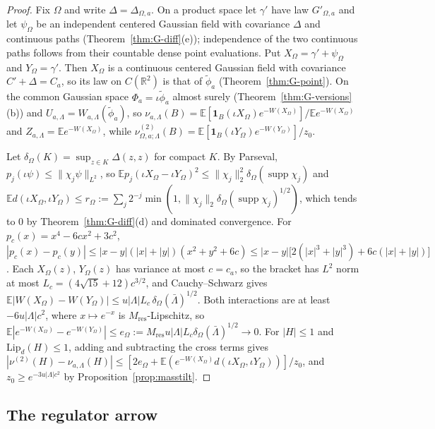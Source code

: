 \documentclass[11pt]{article}
\theoremstyle{plain}
\theoremstyle{definition}
\theoremstyle{remark}
\newcommand{\R}{\mathbb{R}}
\newcommand{\E}{\mathbb{E}}
\newcommand{\ind}{\mathbf{1}}
\DeclareMathOperator{\supp}{supp}
\begin{document}
\begin{proof}
Fix $\Omega$ and write $\Delta=\Delta_{\Omega,a}$. On a product space let $\gamma'$ have law
$G'_{\Omega,a}$ and let $\psi_\Omega$ be an independent centered Gaussian field with
covariance $\Delta$ and continuous paths (Theorem~\ref{thm:G-diff}(e)); independence
of the two continuous paths follows from their countable dense point
evaluations. Put $X_\Omega=\gamma'+\psi_\Omega$ and $Y_\Omega=\gamma'$. Then $X_\Omega$ is a continuous
centered Gaussian field with covariance $C'+\Delta=C_a$, so its law on $C(\R^{2})$ is
that of $\tilde\phi_a$ (Theorem~\ref{thm:G-point}). On the common Gaussian space
$\Phi_a=\iota\tilde\phi_a$ almost surely (Theorem~\ref{thm:G-versions}(b)) and
$U_{a,\Lambda}=W_{a,\Lambda}(\tilde\phi_a)$, so
$\nu_{a,\Lambda}(B)=\E[\ind_B(\iota X_\Omega)e^{-W(X_\Omega)}]/\E e^{-W(X_\Omega)}$ and
$Z_{a,\Lambda}=\E e^{-W(X_\Omega)}$, while
$\nu^{(2)}_{\Omega,a;\Lambda}(B)=\E[\ind_B(\iota Y_\Omega)e^{-W(Y_\Omega)}]/z_0$.

Let $\delta_\Omega(K)=\sup_{z\in K}\Delta(z,z)$ for compact $K$. By Parseval,
$p_j(\iota\psi)\le\|\chi_j\psi\|_{L^{2}}$, so
$\E p_j(\iota X_\Omega-\iota Y_\Omega)^{2}\le\|\chi_j\|_2^{2}\delta_\Omega(\supp\chi_j)$ and
$\E d(\iota X_\Omega,\iota Y_\Omega)\le r_\Omega:=\sum_j2^{-j}\min(1,\|\chi_j\|_2\delta_\Omega(\supp\chi_j)^{1/2})$,
which tends to $0$ by Theorem~\ref{thm:G-diff}(d) and dominated convergence.
For $p_c(x)=x^{4}-6cx^{2}+3c^{2}$,
$|p_c(x)-p_c(y)|\le|x-y|(|x|+|y|)(x^{2}+y^{2}+6c)\le|x-y|\bigl[2(|x|^{3}+|y|^{3})+6c(|x|+|y|)\bigr]$.
Each $X_\Omega(z)$, $Y_\Omega(z)$ has variance at most $c=c_a$, so the bracket has $L^{2}$
norm at most $L_c=(4\sqrt{15}+12)c^{3/2}$, and Cauchy--Schwarz gives
$\E|W(X_\Omega)-W(Y_\Omega)|\le u|\Lambda|L_c\,\delta_\Omega(\bar\Lambda)^{1/2}$. Both interactions are at
least $-6u|\Lambda|c^{2}$, where $x\mapsto e^{-x}$ is $M_{\mathrm{res}}$-Lipschitz, so
$\E|e^{-W(X_\Omega)}-e^{-W(Y_\Omega)}|\le e_\Omega:=M_{\mathrm{res}}u|\Lambda|L_c\delta_\Omega(\bar\Lambda)^{1/2}\to0$.
For $|H|\le1$ and $\mathrm{Lip}_d(H)\le1$, adding and subtracting the cross terms gives
$|\nu^{(2)}(H)-\nu_{a,\Lambda}(H)|\le[2e_\Omega+\E(e^{-W(X_\Omega)}d(\iota X_\Omega,\iota Y_\Omega))]/z_0$, and
$z_0\ge e^{-3u|\Lambda|c^{2}}$ by Proposition~\ref{prop:masstilt}.
\end{proof}

\subsection{The regulator arrow}
\end{document}
